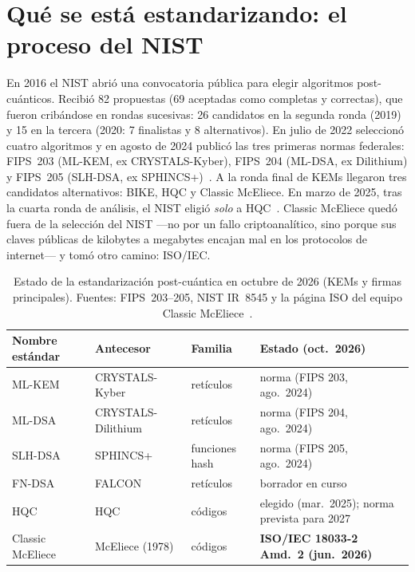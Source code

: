 \documentclass[11pt,a4paper,oneside]{report}
\begin{document}
\section{Qué se está estandarizando: el proceso del NIST}

En 2016 el NIST abrió una convocatoria pública para elegir algoritmos
post-cuánticos. Recibió 82 propuestas (69 aceptadas como completas y
correctas), que fueron cribándose en rondas sucesivas: 26 candidatos en la
segunda ronda (2019) y 15 en la tercera (2020: 7 finalistas y 8
alternativos). En julio de 2022 seleccionó cuatro algoritmos y en agosto de
2024 publicó las tres primeras normas federales: FIPS~203 (ML-KEM, ex
CRYSTALS-Kyber), FIPS~204 (ML-DSA, ex Dilithium) y FIPS~205 (SLH-DSA, ex
SPHINCS+)~\cite{fips203,fips204,fips205}. A la ronda final de KEMs llegaron
tres candidatos alternativos: BIKE, HQC y Classic McEliece. En marzo de
2025, tras la cuarta ronda de análisis, el NIST eligió \emph{solo} a
HQC~\cite{nist8545}. Classic McEliece quedó fuera de la selección del
NIST ---no por un fallo criptoanalítico, sino porque sus claves públicas de
kilobytes a megabytes encajan mal en los protocolos de internet--- y tomó
otro camino: ISO/IEC.

\begin{table}[htbp]
\centering
\caption{Estado de la estandarización post-cuántica en octubre de 2026
(KEMs y firmas principales). Fuentes: FIPS~203--205, NIST IR~8545 y la
página ISO del equipo Classic McEliece~\cite{cmiso}.}
\label{tab:estado}
\small
\begin{tabularx}{\textwidth}{@{}l l l X@{}}
\toprule
\textbf{Nombre estándar} & \textbf{Antecesor} & \textbf{Familia} & \textbf{Estado (oct.\ 2026)} \\
\midrule
ML-KEM & CRYSTALS-Kyber & retículos & norma (FIPS 203, ago.\ 2024) \\
ML-DSA & CRYSTALS-Dilithium & retículos & norma (FIPS 204, ago.\ 2024) \\
SLH-DSA & SPHINCS+ & funciones hash & norma (FIPS 205, ago.\ 2024) \\
FN-DSA & FALCON & retículos & borrador en curso \\
HQC & HQC & códigos & elegido (mar.\ 2025); norma prevista para 2027 \\
Classic McEliece & McEliece (1978) & códigos & \textbf{ISO/IEC 18033-2 Amd.~2 (jun.\ 2026)} \\
\bottomrule
\end{tabularx}
\end{table}
\end{document}
